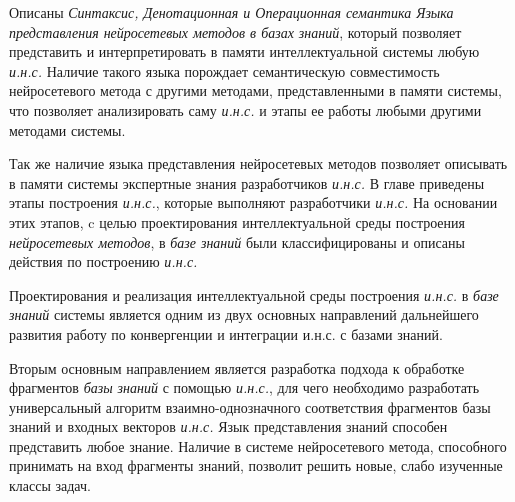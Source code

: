 Описаны \textit{Синтаксис, Денотационная и Операционная семантика Языка представления нейросетевых методов в базах знаний}, который позволяет представить и интерпретировать в памяти интеллектуальной системы любую \textit{и.н.с.} Наличие такого языка порождает семантическую совместимость нейросетевого метода с другими методами, представленными в памяти системы, что позволяет анализировать саму \textit{и.н.с.} и этапы ее работы любыми другими методами системы.

Так же наличие языка представления нейросетевых методов позволяет описывать в памяти системы экспертные знания разработчиков \textit{и.н.с.} В главе приведены этапы построения \textit{и.н.с.}, которые выполняют разработчики \textit{и.н.с.} На основании этих этапов, c целью проектирования интеллектуальной среды построения \textit{нейросетевых методов}, в \textit{базе знаний} были классифицированы и описаны действия по построению \textit{и.н.с.}

Проектирования и реализация интеллектуальной среды построения \textit{и.н.с.} в \textit{базе знаний} системы является одним из двух основных направлений дальнейшего развития работу по конвергенции и интеграции и.н.с. с базами знаний.

Вторым основным направлением является разработка подхода к обработке фрагментов \textit{базы знаний} с помощью \textit{и.н.с.}, для чего необходимо разработать универсальный алгоритм взаимно-однозначного соответствия фрагментов базы знаний и входных векторов \textit{и.н.с.} Язык представления знаний способен представить любое знание. Наличие в системе нейросетевого метода, способного принимать на вход фрагменты знаний, позволит решить новые, слабо изученные классы задач. 